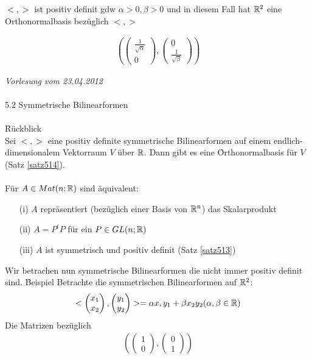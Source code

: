 $<,>$ ist positiv definit gdw $\alpha > 0, \beta > 0$ und in diesem Fall hat $\mathbb{R}^2$ eine Orthonormalbasis bezüglich $<, >$

\begin{align}
\left( \begin{pmatrix} \frac{1}{\sqrt{\alpha}} \\ 0 \end{pmatrix}, \begin{pmatrix} 0 \\ \frac{1}{\sqrt{\beta}} \end{pmatrix} \right)
\end{align}

\newpage
\noindent \textit{Vorlesung vom 23.04.2012} \\\\
\Large 5.2 Symmetrische Bilinearformen \\\\
\normalsize
\f{Rückblick} \\ Sei $<, >$ eine positiv definite symmetrische Bilinearformen auf einem endlich-dimensionalem Vektorraum $V$ über $\mathbb{R}$. Dann gibt es eine \f{Orthonormalbasis} für $V$ (Satz \ref{satz514}).\\\\
Für $A \in Mat(n; \mathbb{R})$ sind äquivalent:
\begin{itemize}
\item[(i)] $A$ repräsentiert (bezüglich einer Basis von $\mathbb{R}^n$) das Skalarprodukt
\item[(ii)] $A = P^t P$ für ein $P \in GL(n; \mathbb{R})$
\item[(iii)] $A$ ist symmetrisch und positiv definit (Satz \ref{satz513})
\end{itemize}
Wir betrachen nun symmetrische Bilinearformen die nicht immer positiv definit sind.
\f{Beispiel}
Betrachte die symmetrischen Bilinearformen auf $\mathbb{R}^2$:
\begin{align}
< \begin{pmatrix} x_1 \\ x_2\end{pmatrix}, \begin{pmatrix} y_1 \\ y_2\end{pmatrix} > = \alpha x, y_1 + \beta x_2 y_2 (\alpha, \beta \in \mathbb{R})
\end{align}
Die Matrizen bezüglich
\begin{align}
(\begin{pmatrix} 1 \\ 0 \end{pmatrix}, \begin{pmatrix} 0 \\ 1\end{pmatrix})
\end{align}
